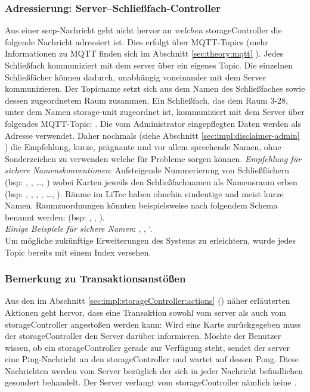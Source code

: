 \subsubsection{Adressierung: Server--Schließfach-Controller}
Aus einer \acrshort{sscp}-Nachricht geht nicht hervor an \textit{welchen} \gls{storageController} die folgende Nachricht adressiert ist. Dies erfolgt über MQTT-Topics (mehr Informationen zu MQTT finden sich im Abschnitt \ref{sec:theory:mqtt} ). Jedes Schließfach kommuniziert mit dem \gls{server} über ein eigenes Topic. Die einzelnen Schließfächer können dadurch, unabhängig voneinander mit dem Server kommunizieren. Der Topicname setzt sich aus dem Namen des Schließfaches sowie dessen zugeordnetem Raum zusammen. Ein Schließfach, das dem Raum \frqq{}3-28\flqq{}, unter dem Namen \frqq{}storage-unit\flqq{} zugeordnet ist, kommuniziert mit dem Server über folgendes MQTT-Topic: \frqq{}\flqq{}. Die vom Administrator eingepflegten Daten werden als Adresse verwendet. Daher nochmals (siehe Abschnitt \ref{sec:impl:disclaimer-admin} ) die Empfehlung, kurze, prägnante und vor allem sprechende Namen, ohne Sonderzeichen zu verwenden welche für Probleme sorgen können. \textit{Empfehlung für sichere Namenskonventionen}: Aufsteigende Nummerierung von Schließfächern (bsp: \frqq{}\flqq{}, \frqq{}\flqq{}, \ldots, \frqq{}\flqq{}) wobei Karten jeweils den Schließfachnamen als Namensraum erben (bsp: \frqq{}\flqq{}, \frqq{}\flqq{}, \frqq{}\flqq{}, \frqq{}\flqq{}, \ldots, \frqq{}\flqq{}). Räume im LiTec haben ohnehin eindeutige und meist kurze Namen. Raumzuordnungen könnten beispielsweise nach folgendem Schema benannt werden:  (bsp: , , ).\\ \textit{Einige Beispiele für sichere Namen}: \frqq{}\flqq{}, \frqq{}\flqq{}, `\flqq{}.\\ Um mögliche zukünftige Erweiterungen des Systems zu erleichtern, wurde jedes Topic bereits mit einem Index \frqq{}\flqq{} versehen.   

\subsubsection{Bemerkung zu Transaktionsanstößen}
Aus den im Abschnitt \ref{sec:impl:storageController:actions} () näher erläuterten Aktionen geht hervor, dass eine Transaktion sowohl vom \gls{server} als auch vom \gls{storageController} angestoßen werden kann: Wird eine Karte zurückgegeben muss der  \gls{storageController} den Server darüber informieren. Möchte der Benutzer wissen, ob ein \gls{storageController} gerade zur Verfügung steht, sendet der \gls{server} eine Ping-Nachricht an den \gls{storageController} und wartet auf dessen Pong. Diese Nachrichten werden vom Server bezüglich der sich in jeder Nachricht befindlichen  gesondert behandelt. Der Server verlangt vom \gls{storageController} nämlich keine . 

